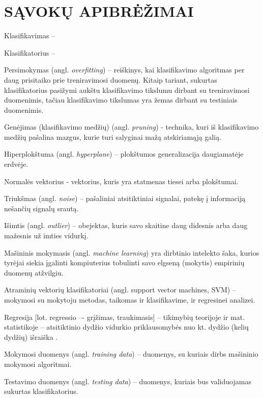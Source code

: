 \section*{SĄVOKŲ APIBRĖŽIMAI}

Klasifikavimas --

Klasifikatorius -- 

Persimokymas (angl. \textit{overfitting}) -- reiškinys, kai klasifikavimo algoritmas per daug prisitaiko prie treniravimosi duomenų. Kitaip tariant, sukurtas klasifikatorius pasižymi aukštu klasifikavimo tikslumu dirbant su treniravimosi duomenimis, tačiau klasifikavimo tikslumas yra žemas dirbant su testiniais duomenimis.

Genėjimas (klasifikavimo medžių)  (angl. \textit{pruning}) - technika, kuri iš klasifikavimo medžių pašalina mazgus, kurie turi salyginai mažą atskiriamąją galią.

Hiperplokštuma (angl. \textit{hyperplane}) -- plokštumos generalizacija daugiamatėje erdvėje.

Normalės vektorius - vektorius, kuris yra statmenas tiesei arba plokštumai.

Triukšmas (angl. \textit{noise}) -- pašaliniai atsitiktiniai signalai, patekę į informaciją nešančių signalų srautą.

Išimtis (angl. \textit{outlier}) -- obejektas, kuris savo skaitine daug didesnis arba daug mažesnis už imties vidurkį.

Mašininis mokymasis (angl. \textit{machine learning}) yra dirbtinio intelekto šaka, kurios tyrėjai siekia įgalinti kompiuterius tobulinti savo elgseną (mokytis) empirinių duomenų atžvilgiu.

Atraminių vektorių klasifikatoriai (angl. support vector machines, SVM) -- mokymosi su mokytoju metodas, taikomas ir klasifikavime, ir regresinei analizei.

Regresija [lot. regressio –- grįžimas, traukimasis] -- tikimybių teorijoje ir mat. statistikoje – atsitiktinio dydžio vidurkio priklausomybės nuo kt. dydžio (kelių dydžių) išraiška \cite{tzz2010}.

Mokymosi duomenys (angl. \textit{training data}) -- duomenys, su kuriais dirbs mašininio mokymosi algoritmai.

Testavimo duomenys (angl. \textit{testing data}) -- duomenys, kuriais bus validuojamas sukurtas klasifikatorius.

